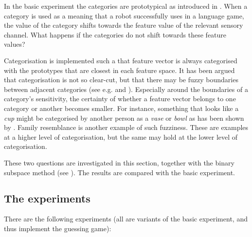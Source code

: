 In the basic experiment the categories are prototypical as introduced in . When a category is used as a meaning that a robot successfully uses in a language game, the value of the category shifts towards the feature value of the relevant sensory channel. What happens if the categories do not shift towards these feature values?

Categorisation is implemented such a that feature vector is always categorised with the prototypes that are closest in each feature space. It has been argued that categorisation is not so clear-cut, but that there may be fuzzy boundaries between adjacent categories (see e.g. \citealt{aitchison:1987} and \citealt{lakoff:1987}). Especially around the boundaries of a category's sensitivity, the certainty of whether a feature vector belongs to one category or another becomes smaller. For instance, something that looks like a {\em cup} might be categorised by another person as a {\em vase} or {\em bowl} as has been shown by \citet{labov:1973}. {\sc Family resemblance} \citep{wittgenstein:1958} is another example of such fuzziness.  These are examples at a higher level of categorisation, but the same may hold at the lower level of categorisation.

These two questions are investigated in this section, together with the binary subspace method (see ). The results are compared with the basic experiment.

\subsection{The experiments}

There are the following experiments (all are variants of the basic experiment, and thus implement the guessing game):

